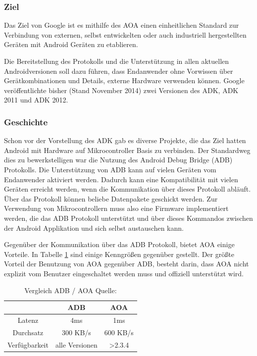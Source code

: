 \documentclass[12pt,journal,compsoc]{IEEEtran}
\begin{document}
\subsubsection{Ziel}
Das Ziel von Google ist es mithilfe des AOA einen einheitlichen Standard zur Verbindung von externen, selbst entwickelten oder auch industriell hergestellten Geräten mit Android Geräten zu etablieren.

Die Bereitstellung des Protokolls und die Unterstützung in allen aktuellen Androidversionen soll dazu führen, dass Endanwender ohne Vorwissen über Gerätkombinationen und Details, externe Hardware verwenden können.
Google veröffentlichte bisher (Stand November 2014) zwei Versionen des ADK, ADK 2011 und ADK 2012. 

\subsubsection{Geschichte}
Schon vor der Vorstellung des ADK gab es diverse Projekte, die das Ziel hatten Android mit Hardware auf Mikrocontroller Basis zu verbinden.
Der Standardweg dies zu bewerkstelligen war die Nutzung des Android Debug Bridge (ADB) Protokolls.
Die Unterstützung von ADB kann auf vielen Geräten vom Endanwender aktiviert werden. Dadurch kann eine Kompatibilität mit vielen Geräten erreicht werden, wenn die Kommunikation über dieses Protokoll abläuft. 
Über das Protokoll können beliebe Datenpakete geschickt werden. Zur Verwendung von Mikrocontrollern muss also eine Firmware implementiert werden, die das ADB Protokoll unterstützt und über dieses Kommandos zwischen der Android Applikation und sich selbst austauschen kann.

Gegenüber der Kommunikation über das ADB Protokoll, bietet AOA einige Vorteile. In Tabelle  \ref{table:vergl} sind einige Kenngrößen gegenüber gestellt. Der größte Vorteil der Benutzung von AOA gegenüber ADB, besteht darin, dass AOA nicht explizit vom Benutzer eingeschaltet werden muss und offiziell unterstützt wird.


\begin{table}
	\centering
	\caption{Vergleich ADB / AOA Quelle: \cite{comp}}
	\label{table:vergl}
	\begin{tabular}{c | c | c}
		& ADB & AOA \\ \hline
		Latenz & 4ms & 1ms \\ \hline
		Durchsatz & 300 KB/s & 600 KB/s \\ \hline
		Verfügbarkeit & alle Versionen & \textgreater 2.3.4 \\ \hline
	\end{tabular}
\end{table}
\end{document}
